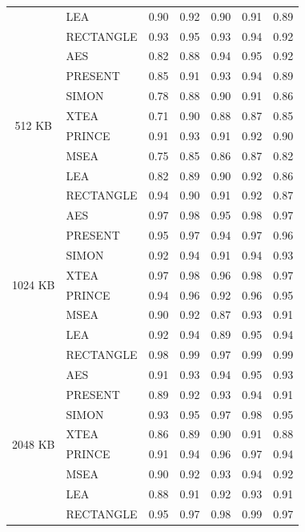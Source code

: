 \documentclass[12pt]{article}
\begin{document}
\begin{table}[p]
{\begin{tabular}{|c|l|c|c|c|c|c|}
& LEA        & 0.90 & 0.92 & 0.90 & 0.91 & 0.89 \\
& RECTANGLE  & 0.93 & 0.95 & 0.93 & 0.94 & 0.92 \\
\hline
\multirow{8}{*}{512 KB}
& AES        & 0.82 & 0.88 & 0.94 & 0.95 & 0.92 \\
& PRESENT    & 0.85 & 0.91 & 0.93 & 0.94 & 0.89 \\
& SIMON      & 0.78 & 0.88 & 0.90 & 0.91 & 0.86 \\
& XTEA       & 0.71 & 0.90 & 0.88 & 0.87 & 0.85 \\
& PRINCE     & 0.91 & 0.93 & 0.91 & 0.92 & 0.90 \\
& MSEA       & 0.75 & 0.85 & 0.86 & 0.87 & 0.82 \\
& LEA        & 0.82 & 0.89 & 0.90 & 0.92 & 0.86 \\
& RECTANGLE  & 0.94 & 0.90 & 0.91 & 0.92 & 0.87 \\
\hline
\multirow{8}{*}{1024 KB}
& AES        & 0.97 & 0.98 & 0.95 & 0.98 & 0.97 \\
& PRESENT    & 0.95 & 0.97 & 0.94 & 0.97 & 0.96 \\
& SIMON      & 0.92 & 0.94 & 0.91 & 0.94 & 0.93 \\
& XTEA       & 0.97 & 0.98 & 0.96 & 0.98 & 0.97 \\
& PRINCE     & 0.94 & 0.96 & 0.92 & 0.96 & 0.95 \\
& MSEA       & 0.90 & 0.92 & 0.87 & 0.93 & 0.91 \\
& LEA        & 0.92 & 0.94 & 0.89 & 0.95 & 0.94 \\
& RECTANGLE  & 0.98 & 0.99 & 0.97 & 0.99 & 0.99 \\
\hline
\multirow{8}{*}{2048 KB}
& AES        & 0.91 & 0.93 & 0.94 & 0.95 & 0.93 \\
& PRESENT    & 0.89 & 0.92 & 0.93 & 0.94 & 0.91 \\
& SIMON      & 0.93 & 0.95 & 0.97 & 0.98 & 0.95 \\
& XTEA       & 0.86 & 0.89 & 0.90 & 0.91 & 0.88 \\
& PRINCE     & 0.91 & 0.94 & 0.96 & 0.97 & 0.94 \\
& MSEA       & 0.90 & 0.92 & 0.93 & 0.94 & 0.92 \\
& LEA        & 0.88 & 0.91 & 0.92 & 0.93 & 0.91 \\
& RECTANGLE  & 0.95 & 0.97 & 0.98 & 0.99 & 0.97 \\
\hline
\end{tabular}%
}
\end{table}
\end{document}
